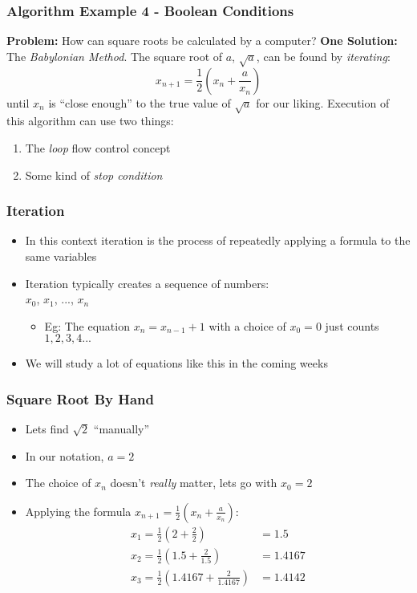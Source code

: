 \documentclass[14pt]{beamer}
\begin{document}
\begin{frame}
\frametitle{Algorithm Example 4 - Boolean Conditions}
{\small
\textbf{Problem:} How can square roots be calculated by a computer?
\linebreak \linebreak
\textbf{One Solution:} The \textit{Babylonian Method}.
\linebreak \linebreak
The square root of $a$, $\sqrt{a}$, can be found by \textit{iterating}:
\begin{equation}
x_{n+1} = \frac{1}{2}\left(x_n + \frac{a}{x_n}\right)
\end{equation}
until $x_n$ is ``close enough'' to the true value of $\sqrt{a}$ for our liking.
Execution of this algorithm can use two things:
\begin{enumerate}
\item The \textit{loop} flow control concept
\item Some kind of \textit{stop condition}
\end{enumerate}
}
\end{frame}

\begin{frame}[fragile]
\frametitle{Iteration}
\begin{itemize}
\item In this context iteration is the process of repeatedly applying a formula to the same variables
\item Iteration typically creates a sequence of numbers:\\$x_0$, $x_1$, ..., $x_n$
\begin{itemize}
\item Eg: The equation $x_n = x_{n-1} + 1$ with a choice of $x_0 = 0$ just counts $1,2,3,4...$
\end{itemize}
\item We will study a lot of equations like this in the coming weeks
\end{itemize}
\end{frame}

\begin{frame}
\frametitle{Square Root By Hand}
\begin{itemize}

\item Lets find $\sqrt{2}$ ``manually''
\item In our notation, $a=2$
\item The choice of $x_n$ doesn't \textit{really} matter, lets go with $x_0=2$
\item Applying the formula $x_{n+1} = \frac{1}{2}\left(x_n + \frac{a}{x_n}\right)$:
\footnotesize
\begin{align*}
x_1 = \frac{1}{2}\left( 2 + \frac{2}{2} \right) &= 1.5 \\
x_2 = \frac{1}{2}\left( 1.5 + \frac{2}{1.5} \right) &= 1.4167 \\
x_3 = \frac{1}{2}\left( 1.4167 + \frac{2}{1.4167} \right) &= 1.4142 \\
\end{align*}

\end{itemize}
\end{frame}
\end{document}
